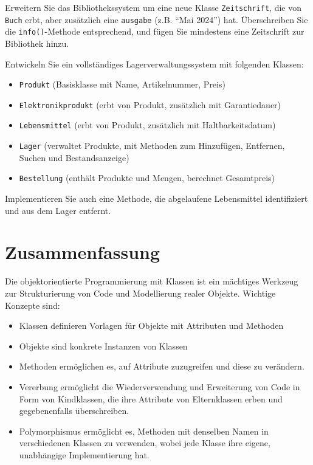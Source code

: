 \begin{myexercise}
	Erweitern Sie das Bibliothekssystem um eine neue Klasse \lstinline|Zeitschrift|, die von \lstinline|Buch| erbt, aber zusätzlich eine \lstinline|ausgabe| (z.B. \enquote{Mai 2024}) hat. Überschreiben Sie die \lstinline|info()|-Methode entsprechend, und fügen Sie mindestens eine Zeitschrift zur Bibliothek hinzu.

	\begin{myanswer}
		
	\end{myanswer}
\end{myexercise}

\begin{mychallenge}
	Entwickeln Sie ein vollständiges Lagerverwaltungssystem mit folgenden Klassen:
	\begin{itemize}
		\item \lstinline|Produkt| (Basisklasse mit Name, Artikelnummer, Preis)
		\item \lstinline|Elektronikprodukt| (erbt von Produkt, zusätzlich mit Garantiedauer)
		\item \lstinline|Lebensmittel| (erbt von Produkt, zusätzlich mit Haltbarkeitsdatum)
		\item \lstinline|Lager| (verwaltet Produkte, mit Methoden zum Hinzufügen, Entfernen, Suchen und Bestandsanzeige)
		\item \lstinline|Bestellung| (enthält Produkte und Mengen, berechnet Gesamtpreis)
	\end{itemize}

	Implementieren Sie auch eine Methode, die abgelaufene Lebensmittel identifiziert und aus dem Lager entfernt.
\end{mychallenge}



\section{Zusammenfassung}
Die objektorientierte Programmierung mit Klassen ist ein mächtiges Werkzeug zur Strukturierung von Code und Modellierung realer Objekte. Wichtige Konzepte sind:

\begin{itemize}
	\item Klassen definieren Vorlagen für Objekte mit Attributen und Methoden
	\item Objekte sind konkrete Instanzen von Klassen
	\item Methoden ermöglichen es, auf Attribute zuzugreifen und diese zu verändern.
	\item Vererbung ermöglicht die Wiederverwendung und Erweiterung von Code in Form von Kindklassen, die ihre Attribute von Elternklassen erben und gegebenenfalls überschreiben.
	\item Polymorphismus ermöglicht es, Methoden mit denselben Namen in verschiedenen Klassen zu verwenden, wobei jede Klasse ihre eigene, unabhängige Implementierung hat.
\end{itemize}

